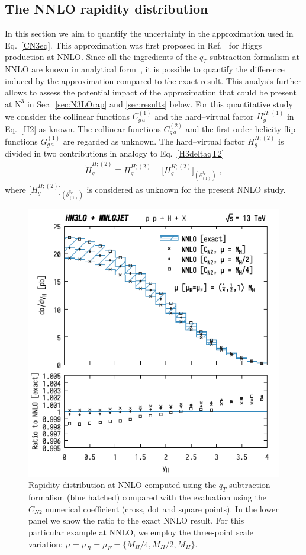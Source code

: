 \documentclass[12pt]{article}
\def\beeq{\begin{eqnarray}}
\def\eeeq{\end{eqnarray}}
\DeclareRobustCommand{\qt}{\ensuremath{q_T}\xspace}
\DeclareRobustCommand{\LO}{\text{LO}\xspace}
\DeclareRobustCommand{\N}[1]{\ensuremath{\text{N}^{#1}}} %
\begin{document}
\subsection{The NNLO rapidity distribution}
\label{sec:NNLOrap}
In this section we aim to quantify the uncertainty in the approximation used in Eq.~\eqref{CN3eq}. This approximation was first proposed in Ref.~\cite{Bozzi:2005wk} for Higgs production at NNLO. Since all the ingredients of the $\qt$ subtraction formalism at NNLO are known in analytical form~\cite{Catani:2011kr}, it is possible to quantify the difference induced by the approximation compared to the exact result. This analysis further allows to assess the potential impact of the approximation that could be present at \N3\LO in Sec.~\ref{sec:N3LOrap} and \ref{sec:results} below. For this quantitative study we consider the collinear functions $C^{(1)}_{g\,a}$ and the hard--virtual factor $H^{H;(1)}_g$ in Eq.~\eqref{H2} as known. The collinear functions $C^{(2)}_{g\,a}$ and the first order helicity-flip functions $G^{(1)}_{g\,a}$ are regarded as unknown. The hard--virtual factor $H^{H;(2)}_g$ is divided in two contributions in analogy to Eq.~\eqref{H3deltaqT2}
\beeq
\widetilde{H}^{H;(2)}_{g}  \equiv H^{H;(2)}_g  -  \big[H^{H;(2)}_{g}\big]_{(\delta^{\qt}_{(1)})} \;,
\eeeq
where $\big[H^{H;(2)}_{g}\big]_{(\delta^{\qt}_{(1)})}$ is considered as unknown for the present NNLO study. 

\begin{figure}[t]
\centering
\includegraphics[width=.6\linewidth]{./new_figures/yH_B02_CN}
\caption{\label{fig:yHCN}{Rapidity distribution at NNLO computed using the $\qt$ subtraction formalism (blue hatched) compared with the evaluation using the $C_{N2}$ numerical coefficient (cross, dot and square points). In the lower panel we show the ratio to the exact NNLO result. For this particular example at NNLO, we employ the three-point scale variation: $\mu=\mu_{R}=\mu_{F}=\{M_{H}/4,M_{H}/2,M_{H}\}$. 
}}
\end{figure}
\end{document}
